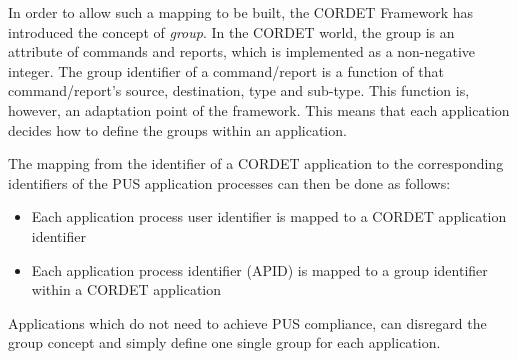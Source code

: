 In order to allow such a mapping to be built, the CORDET Framework has introduced the concept of \textit{group}. In the CORDET world, the group is an attribute of commands and reports, which is implemented as a non-negative integer. The group identifier of a command/report is a function of that command/report's source, destination, type and sub-type. This function is, however, an adaptation point of the framework. This means that each application decides how to define the groups within an application. 

The mapping from the identifier of a CORDET application to the corresponding identifiers of the PUS application processes can then be done as follows:

\begin{itemize}
\item Each application process user identifier is mapped to a CORDET application identifier
\item Each application process identifier (APID) is mapped to a group identifier within a CORDET application 
\end{itemize}

Applications which do not need to achieve PUS compliance, can disregard the group concept and simply define one single group for each application.